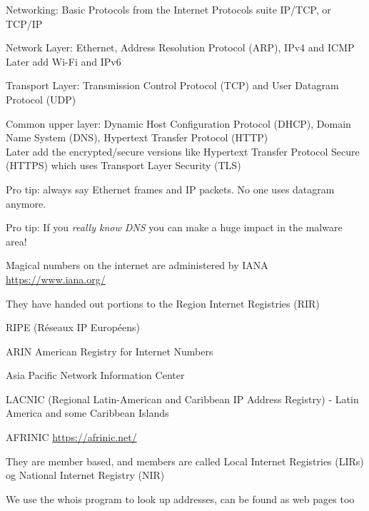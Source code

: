 \documentclass[Screen16to9,17pt]{foils}
\begin{document}
Networking: Basic Protocols from the Internet Protocols suite IP/TCP, or TCP/IP
\begin{list2}
\item Network Layer: Ethernet, Address Resolution Protocol (ARP), IPv4 and ICMP\\
Later add Wi-Fi and IPv6
\item Transport Layer: Transmission Control Protocol (TCP) and User Datagram Protocol (UDP)
\item Common upper layer: Dynamic Host Configuration Protocol (DHCP), Domain Name System (DNS),
Hypertext Transfer Protocol (HTTP)\\
Later add the encrypted/secure versions like Hypertext Transfer Protocol Secure (HTTPS) which uses Transport Layer Security (TLS)
\end{list2}

Pro tip: always say Ethernet frames and IP packets. No one uses datagram anymore.

Pro tip: If you \emph{really know DNS} you can make a huge impact in the malware area!


\begin{list1}
\item Magical numbers on the internet are administered by IANA \url{https://www.iana.org/}
\item They have handed out portions to the Region Internet Registries (RIR)
\begin{list2}
\item RIPE (Réseaux IP Européens)  
\item ARIN American Registry for Internet Numbers 
\item Asia Pacific Network Information Center 
\item LACNIC (Regional Latin-American and Caribbean IP Address Registry) - Latin America and some Caribbean Islands
\item AFRINIC \url{https://afrinic.net/}
\end{list2}
\item They are member based, and members are called Local Internet Registries (LIRs) og National Internet Registry (NIR)
\end{list1}

We use the whois program to look up addresses, can be found as web pages too

\end{document}
